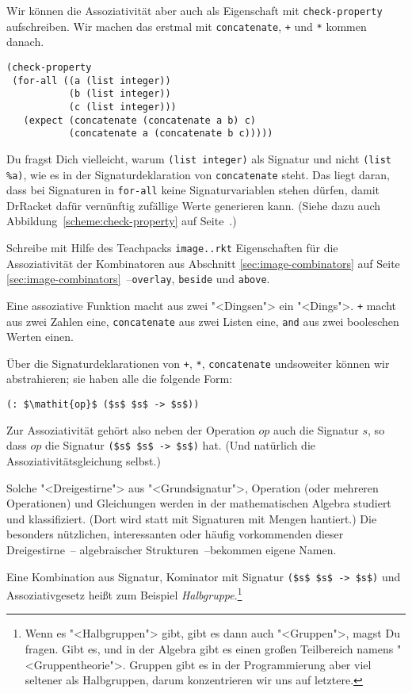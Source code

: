 Wir können die Assoziativität aber auch als Eigenschaft mit
\lstinline{check-property} aufschreiben.  Wir machen das erstmal mit
\lstinline{concatenate}, \lstinline{+} und \lstinline{*} kommen
danach.
%
\begin{lstlisting}
(check-property
 (for-all ((a (list integer))
           (b (list integer))
           (c (list integer)))
   (expect (concatenate (concatenate a b) c)
           (concatenate a (concatenate b c)))))
\end{lstlisting}
%
Du fragst Dich vielleicht, warum \lstinline{(list integer)} als
Signatur und nicht \lstinline{(list %a)},
wie es in der Signaturdeklaration von \lstinline{concatenate} steht.
Das liegt daran, dass bei Signaturen in \lstinline{for-all} keine
Signaturvariablen stehen dürfen, damit DrRacket dafür vernünftig
zufällige Werte generieren kann.  (Siehe dazu auch
Abbildung~\ref{scheme:check-property} auf
Seite~\pageref{scheme:check-property}.)
%
\begin{aufgabeinline}
  Schreibe mit Hilfe des Teachpacks \texttt{image..rkt} Eigenschaften
  für die Assoziativität der Kombinatoren aus Abschnitt
  \ref{sec:image-combinators} auf Seite \ref{sec:image-combinators}~--\lstinline{overlay},
  \lstinline{beside} und \lstinline{above}.
\end{aufgabeinline}
%
Eine assoziative Funktion macht aus zwei "<Dingsen"> ein
"<Dings">.  \lstinline{+} macht aus zwei Zahlen eine,
\lstinline{concatenate} aus zwei Listen eine, \lstinline{and} aus zwei
booleschen Werten einen.

Über die Signaturdeklarationen von \lstinline{+}, \lstinline{*},
\lstinline{concatenate} undsoweiter können wir abstrahieren; sie haben
alle die folgende Form:
%
\begin{lstlisting}
(: $\mathit{op}$ ($s$ $s$ -> $s$))
\end{lstlisting}
%
Zur Assoziativität gehört also neben der Operation $op$ auch die
Signatur $s$, so dass $op$ die Signatur \lstinline{($s$ $s$ -> $s$)}
hat.  (Und natürlich die Assoziativitätsgleichung selbst.)

Solche "<Dreigestirne"> aus "<Grundsignatur">, Operation (oder
mehreren Operationen) und Gleichungen werden in der mathematischen
Algebra studiert und klassifiziert.  (Dort wird statt
mit Signaturen mit Mengen hantiert.)  Die besonders nützlichen,
interessanten oder häufig vorkommenden dieser Dreigestirne~--
algebraischer Strukturen~--bekommen eigene Namen.

Eine Kombination aus Signatur, Kominator mit Signatur
\lstinline{($s$ $s$ -> $s$)}
und Assoziativgesetz heißt zum Beispiel
\textit{Halbgruppe}.\footnote{Wenn es "<Halbgruppen"> gibt,
gibt es dann auch "<Gruppen">, magst Du fragen.  Gibt es, und in der
Algebra gibt es einen großen Teilbereich namens "<Gruppentheorie">.
Gruppen gibt es in der Programmierung aber viel seltener als
Halbgruppen, darum konzentrieren wir uns auf letztere.}

